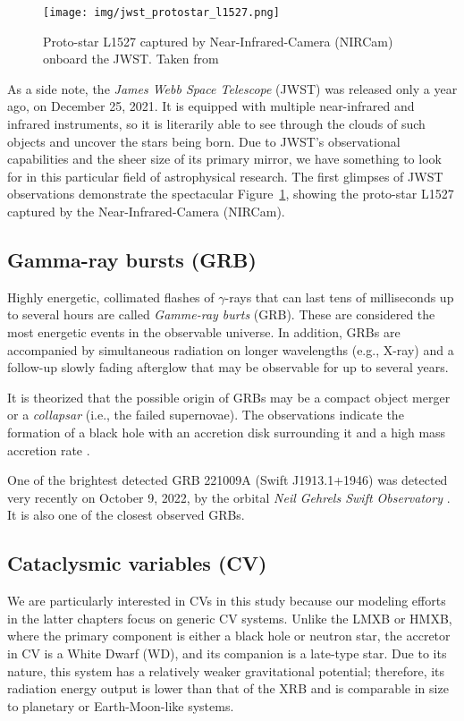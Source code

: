     \begin{figure}[h]
        \centering
        \texttt{[image: img/jwst\_protostar\_l1527.png]}
        \caption{Proto-star L1527 captured by Near-Infrared-Camera (NIRCam) onboard the JWST. Taken from \citep{nasa_img_l1527}}
        \label{fig:jwst_protostar_l1527}
    \end{figure}


    As a side note, the \emph{James Webb Space Telescope} (JWST) was released only a year ago, on December 25, 2021. It is equipped with multiple near-infrared and infrared instruments, so it is literarily able to see through the clouds of such objects and uncover the stars being born. Due to JWST's observational capabilities and the sheer size of its primary mirror, we have something to look for in this particular field of astrophysical research. The first glimpses of JWST observations demonstrate the spectacular Figure~\ref{fig:jwst_protostar_l1527}, showing the proto-star L1527 captured by the Near-Infrared-Camera (NIRCam). 

\subsection{Gamma-ray bursts (GRB)}
    Highly energetic, collimated flashes of $\gamma$-rays that can last tens of milliseconds up to several hours are called \emph{Gamme-ray burts} (GRB). These are considered the most energetic events in the observable universe. In addition, GRBs are accompanied by simultaneous radiation on longer wavelengths (e.g., X-ray) and a follow-up slowly fading afterglow that may be observable for up to several years. 

    It is theorized that the possible origin of GRBs may be a compact object merger or a \emph{collapsar} (i.e., the failed supernovae). The observations indicate the formation of a black hole with an accretion disk surrounding it and a high mass accretion rate \citep{piran2005}.

    One of the brightest detected GRB 221009A (Swift J1913.1+1946) was detected very recently on October 9, 2022, by the orbital \emph{Neil Gehrels Swift Observatory} \citep{grb_221009a}. It is also one of the closest observed GRBs. 

\subsection{Cataclysmic variables (CV)}
    We are particularly interested in CVs in this study because our modeling efforts in the latter chapters focus on generic CV systems. Unlike the LMXB or HMXB, where the primary component is either a black hole or neutron star, the accretor in CV is a White Dwarf (WD), and its companion is a late-type star. Due to its nature, this system has a relatively weaker gravitational potential; therefore, its radiation energy output is lower than that of the XRB and is comparable in size to planetary or Earth-Moon-like systems. 

